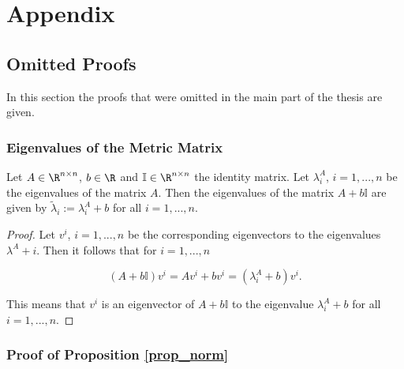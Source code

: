\section{Appendix}

\subsection{Omitted Proofs}

In this section the proofs that were omitted in the main part of the thesis are given.

\subsubsection{Eigenvalues of the Metric Matrix}
\label{proof_eigval}

\begin{proposition}
		Let \(A \in \R^{n\times n}\), \(b \in \R\) and \(\mathbb{I} \in \R^{n\times n}\) the identity matrix.
		Let \(\lambda^A_i\), \(i = 1,...,n\) be the eigenvalues of the matrix \(A\). Then the eigenvalues of the matrix \(A+b\mathbb{I}\) are given by \(\tilde{\lambda}_i := \lambda^A_i + b\) for all \(i = 1,...,n\).
\end{proposition}

\begin{proof}
	Let \(v^i\), \(i = 1,...,n\) be the corresponding eigenvectors to the eigenvalues \(\lambda^A+i\). Then it follows that for \(i = 1,...,n\)
	
	\[ (A+b\mathbb{I})v^i = Av^i+bv^i = (\lambda_i^A + b)v^i. \]
	
	This means that \(v^i\) is an eigenvector of \(A+b\mathbb{I}\) to the eigenvalue \(\lambda_i^A + b\) for all \(i = 1,...,n\).
\end{proof}

\subsubsection{Proof of Proposition \ref{prop_norm}}
\label{proof_norm}

